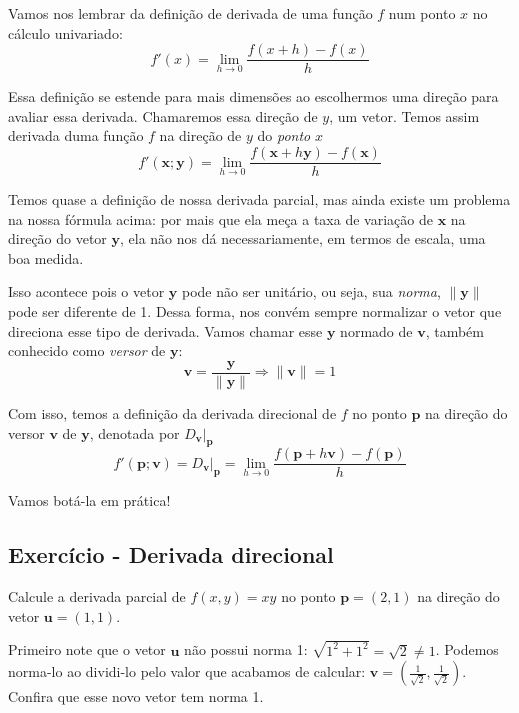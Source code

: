 \documentclass[
  letterpaper,
  DIV=11,
  numbers=noendperiod]{scrreprt}
\begin{document}
Vamos nos lembrar da definição de derivada de uma função \(f\) num ponto
\(x\) no cálculo univariado: \[
f'(x) = \lim_{h\rightarrow 0} \frac{f(x+h)-f(x)}{h}
\]

Essa definição se estende para mais dimensões ao escolhermos uma direção
para avaliar essa derivada. Chamaremos essa direção de \(y\), um vetor.
Temos assim derivada duma função \(f\) na direção de \(y\) do
\emph{ponto} \(x\) \[
f'(\pmb{x};\pmb{y}) = \lim_{h\rightarrow 0} \frac{f(\pmb{x}+h\pmb{y})-f(\pmb{x})}{h} 
\]

Temos quase a definição de nossa derivada parcial, mas ainda existe um
problema na nossa fórmula acima: por mais que ela meça a taxa de
variação de \(\pmb{x}\) na direção do vetor \(\pmb{y}\), ela não nos dá
necessariamente, em termos de escala, uma boa medida.

Isso acontece pois o vetor \(\pmb{y}\) pode não ser unitário, ou seja,
sua \emph{norma}, \(\lVert \pmb{y} \rVert\) pode ser diferente de 1.
Dessa forma, nos convém sempre normalizar o vetor que direciona esse
tipo de derivada. Vamos chamar esse \(\pmb{y}\) normado de \(\pmb{v}\),
também conhecido como \emph{versor} de \(\pmb{y}\): \[
\pmb{v} = \frac{\pmb{y}}{\lVert \pmb{y} \rVert} \Rightarrow \lVert \pmb{v} \rVert = 1
\]

Com isso, temos a definição da derivada direcional de \(f\) no ponto
\(\pmb{p}\) na direção do versor \(\pmb{v}\) de \(\pmb{y}\), denotada
por \(D_{\pmb{v}}\rvert_{\pmb{p}}\) \[
f'(\pmb{p};\pmb{v})= D_{\pmb{v}}\rvert_{\pmb{p}} = \lim_{h\rightarrow 0} \frac{f(\pmb{p}+h\pmb{v})-f(\pmb{p})}{h} 
\]

Vamos botá-la em prática!

\subsection{Exercício - Derivada
direcional}\label{exercuxedcio---derivada-direcional}

Calcule a derivada parcial de \(f(x,y) = xy\) no ponto
\(\pmb{p} = (2,1)\) na direção do vetor \(\pmb{u} = (1,1)\).

Primeiro note que o vetor \(\pmb{u}\) não possui norma 1:
\(\sqrt{1^2+1^2}=\sqrt{2}\neq 1\). Podemos norma-lo ao dividi-lo pelo
valor que acabamos de calcular:
\(\pmb{v} = \left(\frac{1}{\sqrt{2}}, \frac{1}{\sqrt{2}}\right)\).
Confira que esse novo vetor tem norma 1.
\end{document}
